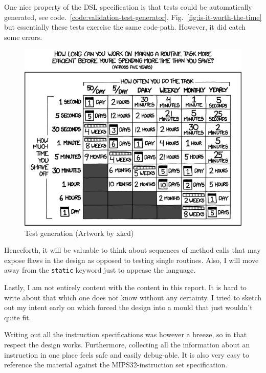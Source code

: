 \documentclass[a4paper]{article}
\newcommand{\mij}[1]{\texttt{#1}}
\begin{document}
One nice property of the DSL specification is that tests could be
automatically generated, see
code.~\ref{code:validation-test-generator},
Fig.~\eqref{fig:is-it-worth-the-time} but essentially these tests
exercise the same code-path. However, it did catch some errors.

\begin{figure}[htpb]
  \centering
  \includegraphics[width=\textwidth]{img/is_it_worth_the_time.png}
  \caption{Test generation (Artwork by xkcd)}
  \label{fig:is-it-worth-the-time}
\end{figure}

Henceforth, it will be valuable to think about sequences of method
calls that may expose flaws in the design as opposed to testing single
routines. Also, I will move away from the \mij{static} keyword just to
appease the language.

Lastly, I am not entirely content with the content in this report.  It
is hard to write about that which one does not know without any
certainty. I tried to sketch out my intent early on which forced the
design into a mould that just wouldn't quite fit.

Writing out all the instruction specifications was however a breeze,
so in that respect the design works. Furthermore, collecting all the
information about an instruction in one place feels safe and easily
debug-able. It is also very easy to reference the material against
the MIPS32-instruction set specification.

\printbibliography
\end{document}
